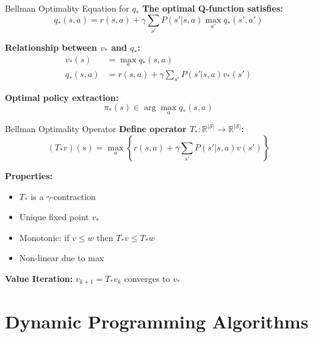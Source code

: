 \documentclass[aspectratio=169,10pt]{beamer}
\begin{document}
\begin{frame}{Bellman Optimality Equation for $q_*$}
\textbf{The optimal Q-function satisfies:}
\begin{equation}
q_*(s,a) = r(s,a) + \gamma \sum_{s'} P(s'|s,a) \max_{a'} q_*(s',a')
\end{equation}

\textbf{Relationship between $v_*$ and $q_*$:}
\begin{align}
v_*(s) &= \max_a q_*(s,a) \\
q_*(s,a) &= r(s,a) + \gamma \sum_{s'} P(s'|s,a) v_*(s')
\end{align}

\textbf{Optimal policy extraction:}
\begin{equation}
\pi_*(s) \in \arg\max_a q_*(s,a)
\end{equation}
\end{frame}

\begin{frame}{Bellman Optimality Operator}
\textbf{Define operator $T_*: \mathbb{R}^{|\mathcal{S}|} \rightarrow \mathbb{R}^{|\mathcal{S}|}$:}
\begin{equation}
(T_* v)(s) = \max_a \left\{ r(s,a) + \gamma \sum_{s'} P(s'|s,a) v(s') \right\}
\end{equation}

\textbf{Properties:}
\begin{itemize}
    \item $T_*$ is a $\gamma$-contraction
    \item Unique fixed point $v_*$
    \item Monotonic: if $v \leq w$ then $T_* v \leq T_* w$
    \item Non-linear due to max
\end{itemize}

\textbf{Value Iteration:} $v_{k+1} = T_* v_k$ converges to $v_*$
\end{frame}

\section{Dynamic Programming Algorithms}
\end{document}
